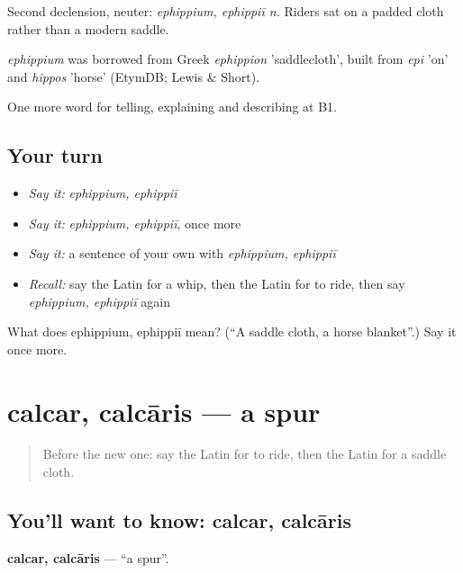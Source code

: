 Second declension, neuter: \emph{ephippium, ephippiī n.} Riders sat on a padded cloth rather than a modern saddle.

\begin{cousinweb}
\emph{ephippium} was borrowed from Greek \emph{ephippion} 'saddlecloth', built from \emph{epi} 'on' and \emph{hippos} 'horse' (EtymDB; Lewis \& Short).
\end{cousinweb}

\begin{grammarlens}[title={What you've built}]
One more word for telling, explaining and describing at B1.
\end{grammarlens}

\subsection*{Your turn}
\begin{itemize}
\raggedright
  \item \emph{Say it:} \emph{ephippium, ephippiī}
  \item \emph{Say it:} \emph{ephippium, ephippiī}, once more
  \item \emph{Say it:} a sentence of your own with \emph{ephippium, ephippiī}
  \item \emph{Recall:} say the Latin for a whip, then the Latin for to ride, then say \emph{ephippium, ephippiī} again
\end{itemize}

\begin{tcolorbox}[breakable,colback=teal!4,colframe=teal!35!black,title={Before you move on}]
What does ephippium, ephippiī mean? (\textquotedblleft{}A saddle cloth, a horse blanket\textquotedblright{}.) Say it once more.
\end{tcolorbox}
\section[calcar, calcāris]{calcar, calcāris — a spur}

\label{lesson:LA-C432-calcar}



\begin{quote}
Before the new one: say the Latin for to ride, then the Latin for a saddle cloth.
\end{quote}

\subsection*{You'll want to know: calcar, calcāris}
\textbf{calcar, calcāris} — \textquotedblleft{}a spur\textquotedblright{}.

